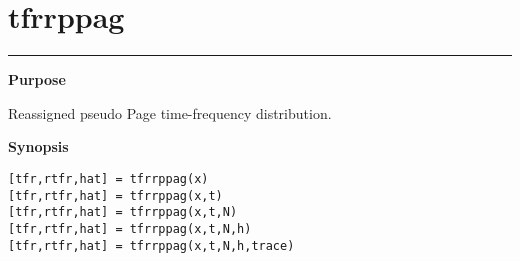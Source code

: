 

\section*{\hspace*{-1.6cm} tfrrppag}

\vspace*{-.4cm}
\hspace*{-1.6cm}\rule[0in]{16.5cm}{.02cm}
\vspace*{.2cm}

{\bf \large \sf Purpose}\\
\hspace*{1.5cm}
\begin{minipage}[t]{13.5cm}
Reassigned pseudo Page time-frequency distribution.
\end{minipage}
\vspace*{.5cm}

{\bf \large \sf Synopsis}\\
\hspace*{1.5cm}
\begin{minipage}[t]{13.5cm}
\begin{verbatim}
[tfr,rtfr,hat] = tfrrppag(x)
[tfr,rtfr,hat] = tfrrppag(x,t)
[tfr,rtfr,hat] = tfrrppag(x,t,N)
[tfr,rtfr,hat] = tfrrppag(x,t,N,h)
[tfr,rtfr,hat] = tfrrppag(x,t,N,h,trace)
\end{verbatim}
\end{minipage}
\vspace*{.5cm}

